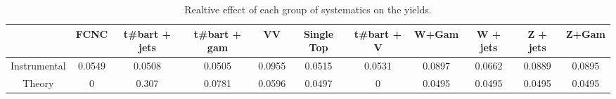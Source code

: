 \begin{table}[htbp]
\begin{center}
\begin{tabular}{|c|c|c|c|c|c|c|c|c|c|c|}
\hline 
      & FCNC      & t#bar{t} + jets      & t#bar{t} +  gam      & VV      & Single Top      & t#bar{t} + V      & W+Gam      & W + jets      & Z + jets      & Z+Gam \\ 
\hline 
 Instrumental & 0.0549 & 0.0508 & 0.0505 & 0.0955 & 0.0515 & 0.0531 & 0.0897 & 0.0662 & 0.0889 & 0.0895 \\ 
 Theory & 0 & 0.307 & 0.0781 & 0.0596 & 0.0497 & 0 & 0.0495 & 0.0495 & 0.0495 & 0.0495 \\ 
\hline 
\end{tabular} 
\caption{Realtive effect of each group of systematics on the yields.} 
\end{center} 
\end{table} 
